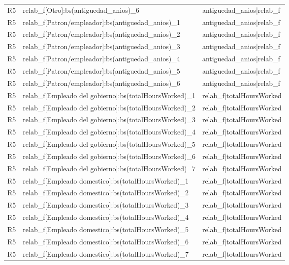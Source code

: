 \begin{longtable}{lll}
R5 & relab\_f[Otro]:bs(antiguedad\_anios)\_6 & antiguedad\_anios|relab\_f \\
R5 & relab\_f[Patron/empleador]:bs(antiguedad\_anios)\_1 & antiguedad\_anios|relab\_f \\
R5 & relab\_f[Patron/empleador]:bs(antiguedad\_anios)\_2 & antiguedad\_anios|relab\_f \\
R5 & relab\_f[Patron/empleador]:bs(antiguedad\_anios)\_3 & antiguedad\_anios|relab\_f \\
R5 & relab\_f[Patron/empleador]:bs(antiguedad\_anios)\_4 & antiguedad\_anios|relab\_f \\
R5 & relab\_f[Patron/empleador]:bs(antiguedad\_anios)\_5 & antiguedad\_anios|relab\_f \\
R5 & relab\_f[Patron/empleador]:bs(antiguedad\_anios)\_6 & antiguedad\_anios|relab\_f \\
R5 & relab\_f[Empleado del gobierno]:bs(totalHoursWorked)\_1 & relab\_f|totalHoursWorked \\
R5 & relab\_f[Empleado del gobierno]:bs(totalHoursWorked)\_2 & relab\_f|totalHoursWorked \\
R5 & relab\_f[Empleado del gobierno]:bs(totalHoursWorked)\_3 & relab\_f|totalHoursWorked \\
R5 & relab\_f[Empleado del gobierno]:bs(totalHoursWorked)\_4 & relab\_f|totalHoursWorked \\
R5 & relab\_f[Empleado del gobierno]:bs(totalHoursWorked)\_5 & relab\_f|totalHoursWorked \\
R5 & relab\_f[Empleado del gobierno]:bs(totalHoursWorked)\_6 & relab\_f|totalHoursWorked \\
R5 & relab\_f[Empleado del gobierno]:bs(totalHoursWorked)\_7 & relab\_f|totalHoursWorked \\
R5 & relab\_f[Empleado domestico]:bs(totalHoursWorked)\_1 & relab\_f|totalHoursWorked \\
R5 & relab\_f[Empleado domestico]:bs(totalHoursWorked)\_2 & relab\_f|totalHoursWorked \\
R5 & relab\_f[Empleado domestico]:bs(totalHoursWorked)\_3 & relab\_f|totalHoursWorked \\
R5 & relab\_f[Empleado domestico]:bs(totalHoursWorked)\_4 & relab\_f|totalHoursWorked \\
R5 & relab\_f[Empleado domestico]:bs(totalHoursWorked)\_5 & relab\_f|totalHoursWorked \\
R5 & relab\_f[Empleado domestico]:bs(totalHoursWorked)\_6 & relab\_f|totalHoursWorked \\
R5 & relab\_f[Empleado domestico]:bs(totalHoursWorked)\_7 & relab\_f|totalHoursWorked \\

\end{longtable}
